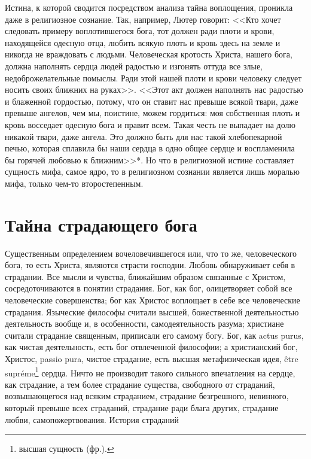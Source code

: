 \documentclass[12pt,oneside]{book}
\newcommand{\rom}[1]{\uppercase\expandafter{\romannumeral #1\relax}}
\begin{document}
Истина, к которой сводится посредством анализа тайна воплощения, проникла даже в религиозное сознание. Так, например, Лютер говорит: <<Кто хочет следовать примеру воплотившегося бога, тот должен ради плоти и крови, находящейся одесную отца, любить всякую плоть и кровь здесь на земле и никогда не враждовать с людьми. Человеческая кротость Христа, нашего бога, должна наполнять сердца людей радостью и изгонять оттуда все злые, недоброжелательные помыслы. Ради этой нашей плоти и крови человеку следует носить своих ближних на руках>>. <<Этот акт должен наполнять нас радостью и блаженной гордостью, потому, что он ставит нас превыше всякой твари, даже превыше ангелов, чем мы, поистине, можем гордиться: моя собственная плоть и кровь восседает одесную бога и правит всем. Такая честь не выпадает на долю никакой твари, даже ангела. Это должно быть для нас такой хлебопекарной печью, которая сплавила бы наши сердца в одно общее сердце и воспламенила бы горячей любовью к ближним>>*\let\svthefootnote\thefootnote\let\thefootnote\relax\footnotetext{*Лютер, ч. \rom{15}, стр. 44.}\let\thefootnote\svthefootnote. Но что в религиозной истине составляет сущность мифа, самое ядро, то в религиозном сознании является лишь моралью мифа, только чем-то второстепенным.





\chapter{Тайна страдающего бога}


Существенным определением вочеловечившегося или, что то же, человеческого бога, то есть Христа, являются страсти господни. Любовь обнаруживает себя в страдании. Все мысли и чувства, ближайшим образом связанные с Христом, сосредоточиваются в понятии страдания. Бог, как бог, олицетворяет собой все человеческие совершенства; бог как Христос воплощает в себе все человеческие страдания. Языческие философы считали высшей, божественной деятельностью деятельность вообще и, в особенности, самодеятельность разума; христиане считали страдание священным, приписали его самому богу. Бог, как actus purus, как чистая деятельность, есть бог отвлеченной философии; а христианский бог, Христос, passio pura, чистое страдание, есть высшая метафизическая идея, \^{e}tre supr\'eme\footnote{высшая сущность (фр.).} сердца. Ничто не производит такого сильного впечатления на сердце, как страдание, а тем более страдание существа, свободного от страданий, возвышающегося над всяким страданием, страдание безгрешного, невинного, который превыше всех страданий, страдание ради блага других, страдание любви, самопожертвования. История страданий
\end{document}
